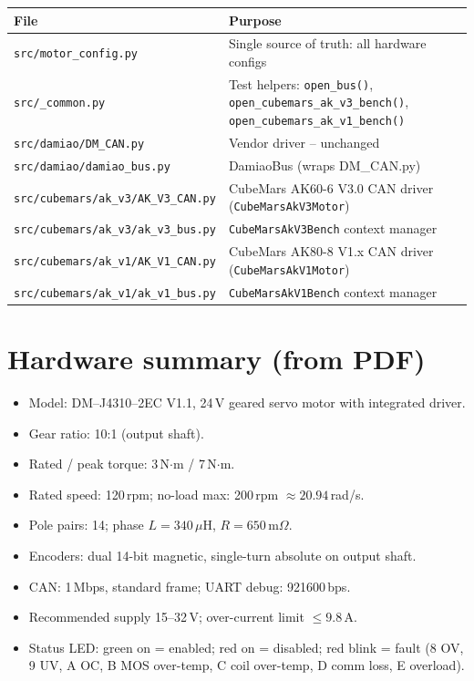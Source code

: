 \documentclass[11pt,a4paper]{article}
\begin{document}
\begin{center}\small
\begin{tabular}{ll}
\toprule
File & Purpose\\
\midrule
\texttt{src/motor\_config.py}               & Single source of truth: all hardware configs\\
\texttt{src/\_common.py}                    & Test helpers: \texttt{open\_bus()}, \texttt{open\_cubemars\_ak\_v3\_bench()}, \texttt{open\_cubemars\_ak\_v1\_bench()}\\
\texttt{src/damiao/DM\_CAN.py}              & Vendor driver -- unchanged\\
\texttt{src/damiao/damiao\_bus.py}          & DamiaoBus (wraps DM\_CAN.py)\\
\texttt{src/cubemars/ak\_v3/AK\_V3\_CAN.py} & CubeMars AK60-6 V3.0 CAN driver (\texttt{CubeMarsAkV3Motor})\\
\texttt{src/cubemars/ak\_v3/ak\_v3\_bus.py} & \texttt{CubeMarsAkV3Bench} context manager\\
\texttt{src/cubemars/ak\_v1/AK\_V1\_CAN.py} & CubeMars AK80-8 V1.x CAN driver (\texttt{CubeMarsAkV1Motor})\\
\texttt{src/cubemars/ak\_v1/ak\_v1\_bus.py} & \texttt{CubeMarsAkV1Bench} context manager\\
\bottomrule
\end{tabular}
\end{center}

\section{Hardware summary (from PDF)}
\begin{itemize}
  \item Model: DM--J4310--2EC V1.1, 24\,V geared servo motor with integrated driver.
  \item Gear ratio: 10:1 (output shaft).
  \item Rated / peak torque: 3\,N$\cdot$m / 7\,N$\cdot$m.
  \item Rated speed: 120\,rpm; no-load max: 200\,rpm $\approx 20.94$\,rad/s.
  \item Pole pairs: 14; phase $L=340\,\mu\mathrm{H}$, $R=650\,\mathrm{m}\Omega$.
  \item Encoders: dual 14-bit magnetic, single-turn absolute on output shaft.
  \item CAN: 1\,Mbps, standard frame; UART debug: 921600\,bps.
  \item Recommended supply 15--32\,V; over-current limit $\le 9.8$\,A.
  \item Status LED: green on = enabled; red on = disabled; red blink = fault
        (8 OV, 9 UV, A OC, B MOS over-temp, C coil over-temp, D comm loss, E overload).
\end{itemize}
\end{document}
